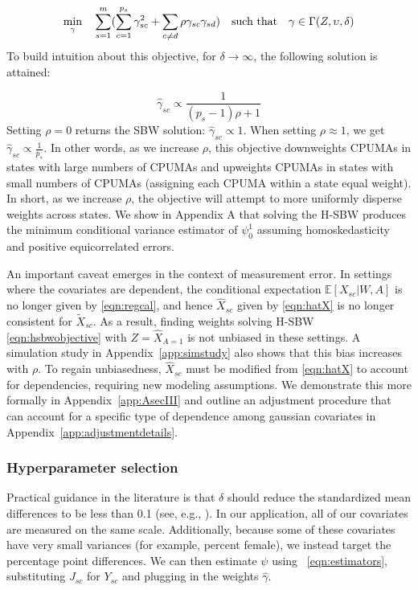 \documentclass[aoas]{imsart}
\theoremstyle{plain}
\theoremstyle{remark}
\begin{document}
\begin{equation}\label{eqn:hsbwobjective}
\min_{\gamma} \quad \sum_{s=1}^{m}(\sum_{c = 1}^{p_s}\gamma_{sc}^2 + \sum_{c \ne d}\rho \gamma_{sc}\gamma_{sd}) \quad \text{such that} \quad \gamma \in \Gamma(Z, \upsilon, \delta)\\
\end{equation}
To build intuition about this objective, for $\delta \to \infty$, the following solution is attained:

\begin{equation}\label{eqn:sbwsol}
\hat{\gamma}_{sc} \propto \frac{1}{(p_s - 1)\rho + 1}
\end{equation}
Setting $\rho = 0$ returns the SBW solution: $\hat{\gamma}_{sc} \propto 1$. When setting $\rho \approx 1$, we get $\hat{\gamma}_{sc} \propto \frac{1}{p_s}$. In other words, as we increase $\rho$, this objective downweights CPUMAs in states with large numbers of CPUMAs and upweights CPUMAs in states with small numbers of CPUMAs (assigning each CPUMA within a state equal weight). In short, as we increase $\rho$, the objective will attempt to more uniformly disperse weights across states. We show in Appendix A that solving the H-SBW produces the minimum conditional variance estimator of $\psi_0^1$ assuming homoskedasticity and positive equicorrelated errors.

An important caveat emerges in the context of measurement error. In settings where the covariates are dependent, the conditional expectation $\mathbb{E}[X_{sc}|W,A]$ is no longer given by \eqref{eqn:regcal}, and hence $\hat{X}_{sc}$ given by \eqref{eqn:hatX} is no longer consistent for $\tilde{X}_{sc}$. As a result, finding weights solving H-SBW \eqref{eqn:hsbwobjective} with $Z = \hat{X}_{A=1}$ is not unbiased in these settings. A simulation study in Appendix~\ref{app:simstudy} also shows that this bias increases with $\rho$. To regain unbiasedness, $\hat{X}_{sc}$ must be modified from \eqref{eqn:hatX} to account for dependencies, requiring new modeling assumptions. We demonstrate this more formally in Appendix~\ref{app:AsecIII} and outline an adjustment procedure that can account for a specific type of dependence among gaussian covariates in Appendix~\ref{app:adjustmentdetails}.

\subsubsection{Hyperparameter selection} \label{ssec:delta}

Practical guidance in the literature is that $\delta$ should reduce the standardized mean differences to be less than 0.1 (see, e.g., \cite{zhang2019balance}). In our application, all of our covariates are measured on the same scale. Additionally, because some of these covariates have very small variances (for example, percent female), we instead target the percentage point differences. We can then estimate $\psi$ using ~\eqref{eqn:estimators}, substituting $J_{sc}$ for $Y_{sc}$ and plugging in the weights $\hat{\gamma}$.
\end{document}

